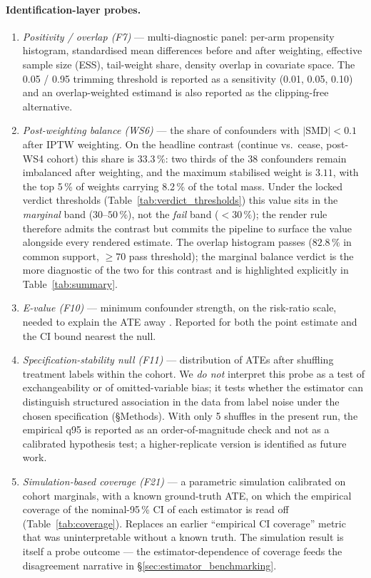 \documentclass[11pt,a4paper]{article}
\begin{document}
\paragraph{Identification-layer probes.}
\begin{enumerate}[leftmargin=*,itemsep=2pt]
\item \emph{Positivity / overlap (F7)} --- multi-diagnostic panel: per-arm propensity histogram, standardised mean differences before and after weighting, effective sample size (ESS), tail-weight share, density overlap in covariate space. The 0.05 / 0.95 trimming threshold is reported as a sensitivity (0.01, 0.05, 0.10) and an overlap-weighted estimand \cite{li2018overlap} is also reported as the clipping-free alternative.
\item \emph{Post-weighting balance (WS6)} --- the share of confounders with $|$SMD$|<0.1$ \cite{austin2009smd} after IPTW weighting. On the headline contrast (continue vs.\ cease, post-WS4 cohort) this share is $33.3\,\%$: two thirds of the 38 confounders remain imbalanced after weighting, and the maximum stabilised weight is $3.11$, with the top 5\,\% of weights carrying 8.2\,\% of the total mass. Under the locked verdict thresholds (Table~\ref{tab:verdict_thresholds}) this value sits in the \emph{marginal} band ($30$--$50\,\%$), not the \emph{fail} band ($<30\,\%$); the render rule therefore admits the contrast but commits the pipeline to surface the value alongside every rendered estimate. The overlap histogram passes ($82.8\,\%$ in common support, $\geq 70$ pass threshold); the marginal balance verdict is the more diagnostic of the two for this contrast and is highlighted explicitly in Table~\ref{tab:summary}.
\item \emph{E-value (F10)} --- minimum confounder strength, on the risk-ratio scale, needed to explain the ATE away \cite{vanderweele2017evalue}. Reported for both the point estimate and the CI bound nearest the null.
\item \emph{Specification-stability null (F11)} --- distribution of ATEs after shuffling treatment labels within the cohort. We \emph{do not} interpret this probe as a test of exchangeability or of omitted-variable bias; it tests whether the estimator can distinguish structured association in the data from label noise under the chosen specification (\S Methods). With only 5 shuffles in the present run, the empirical q95 is reported as an order-of-magnitude check and not as a calibrated hypothesis test; a higher-replicate version is identified as future work.
\item \emph{Simulation-based coverage (F21)} --- a parametric simulation calibrated on cohort marginals, with a known ground-truth ATE, on which the empirical coverage of the nominal-95\,\% CI of each estimator is read off (Table~\ref{tab:coverage}). Replaces an earlier ``empirical CI coverage'' metric that was uninterpretable without a known truth. The simulation result is itself a probe outcome --- the estimator-dependence of coverage feeds the disagreement narrative in \S\ref{sec:estimator_benchmarking}.
\end{enumerate}
\end{document}
